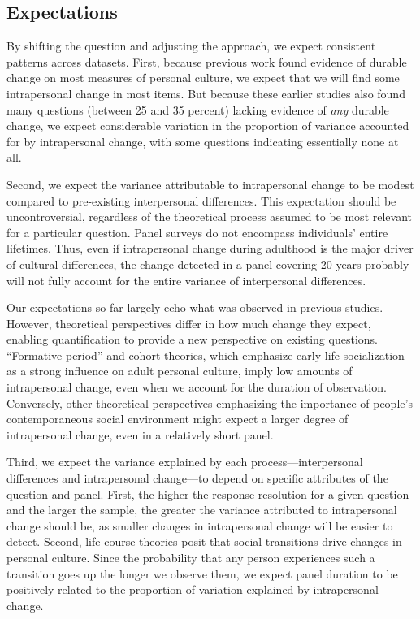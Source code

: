 \documentclass[
  12pt,
]{article}
\begin{document}
\hypertarget{expectations}{%
\subsection{Expectations}\label{expectations}}

By shifting the question and adjusting the approach, we expect
consistent patterns across datasets. First, because previous work found
evidence of durable change on most measures of personal culture, we
expect that we will find some intrapersonal change in most items. But
because these earlier studies also found many questions (between 25 and
35 percent) lacking evidence of \emph{any} durable change, we expect
considerable variation in the proportion of variance accounted for by
intrapersonal change, with some questions indicating essentially none at
all.

Second, we expect the variance attributable to intrapersonal change to
be modest compared to pre-existing interpersonal differences. This
expectation should be uncontroversial, regardless of the theoretical
process assumed to be most relevant for a particular question. Panel
surveys do not encompass individuals' entire lifetimes. Thus, even if
intrapersonal change during adulthood is the major driver of cultural
differences, the change detected in a panel covering 20 years probably
will not fully account for the entire variance of interpersonal
differences.

Our expectations so far largely echo what was observed in previous
studies. However, theoretical perspectives differ in how much change
they expect, enabling quantification to provide a new perspective on
existing questions. ``Formative period'' and cohort theories, which
emphasize early-life socialization as a strong influence on adult
personal culture, imply low amounts of intrapersonal change, even when
we account for the duration of observation. Conversely, other
theoretical perspectives emphasizing the importance of people's
contemporaneous social environment might expect a larger degree of
intrapersonal change, even in a relatively short panel.

Third, we expect the variance explained by each process---interpersonal
differences and intrapersonal change---to depend on specific attributes
of the question and panel. First, the higher the response resolution for
a given question and the larger the sample, the greater the variance
attributed to intrapersonal change should be, as smaller changes in
intrapersonal change will be easier to detect. Second, life course
theories posit that social transitions drive changes in personal
culture. Since the probability that any person experiences such a
transition goes up the longer we observe them, we expect panel duration
to be positively related to the proportion of variation explained by
intrapersonal change.
\end{document}
